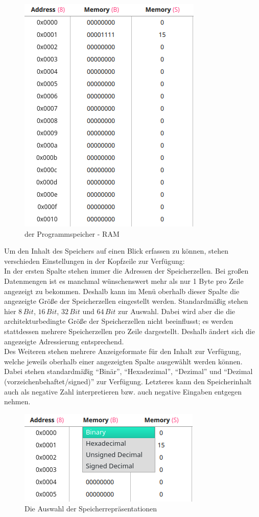 \begin{figure}[ht]
	\centering
  \includegraphics[scale=1]{Images/Memory}
	\caption{der Programmspeicher - RAM}
	\label{Memory}
\end{figure}

Um den Inhalt des Speichers auf einen Blick erfassen zu können, stehen
verschieden Einstellungen in der Kopfzeile zur Verfügung:\\ In der ersten Spalte
stehen immer die Adressen der Speicherzellen. Bei großen Datenmengen ist es
manchmal wünschenswert mehr als nur 1 Byte pro Zeile angezeigt zu bekommen.
Deshalb kann im Menü oberhalb dieser Spalte die angezeigte Größe der
Speicherzellen eingestellt werden. Standardmäßig stehen hier $8\, Bit$, $16\,
Bit$, $32\, Bit$ und $64\, Bit$ zur Auswahl. Dabei wird aber die die
architekturbedingte Größe der Speicherzellen nicht beeinflusst; es werden
stattdessen mehrere Speicherzellen pro Zeile dargestellt. Deshalb ändert sich
die angezeigte Adressierung entsprechend.\\ Des Weiteren stehen mehrere
Anzeigeformate für den Inhalt zur Verfügung, welche jeweils oberhalb einer
angezeigten Spalte ausgewählt werden können. Dabei stehen standardmäßig
``Binär'', ``Hexadezimal'', ``Dezimal'' und ``Dezimal
(vorzeichenbehaftet/signed)'' zur Verfügung. Letzteres kann den Speicherinhalt
auch als negative Zahl interpretieren bzw. auch negative Eingaben entgegen
nehmen. \\

\begin{figure}[ht]
	\centering
  \includegraphics[scale=1]{Images/Memory_Representation}
	\caption{Die Auswahl der Speicherrepräsentationen}
	\label{Memory_Respresentations}
\end{figure}

